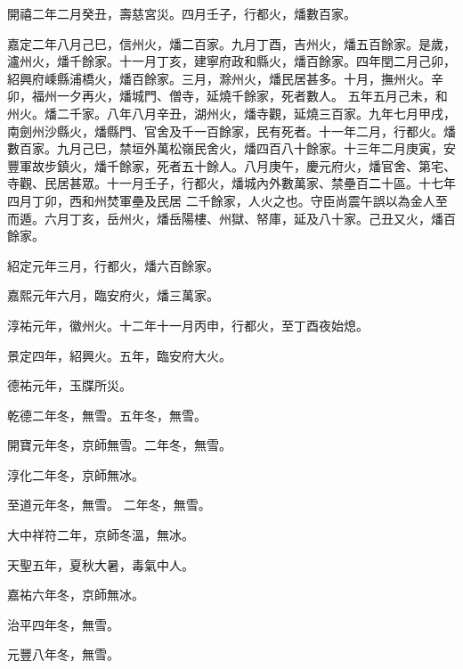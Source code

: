 \begin{pinyinscope}
 開禧二年二月癸丑，壽慈宮災。四月壬子，行都火，燔數百家。



 嘉定二年八月己巳，信州火，燔二百家。九月丁酉，吉州火，燔五百餘家。是歲，瀘州火，燔千餘家。十一月丁亥，建寧府政和縣火，燔百餘家。四年閏二月己卯，紹興府嵊縣浦橋火，燔百餘家。三月，滁州火，燔民居甚多。十月，撫州火。辛卯，福州一夕再火，燔城門、僧寺，延燒千餘家，死者數人。
 五年五月己未，和州火。燔二千家。八年八月辛丑，湖州火，燔寺觀，延燒三百家。九年七月甲戌，南劍州沙縣火，燔縣門、官舍及千一百餘家，民有死者。十一年二月，行都火。燔數百家。九月己巳，禁垣外萬松嶺民舍火，燔四百八十餘家。十三年二月庚寅，安豐軍故步鎮火，燔千餘家，死者五十餘人。八月庚午，慶元府火，燔官舍、第宅、寺觀、民居甚眾。十一月壬子，行都火，燔城內外數萬家、禁壘百二十區。十七年四月丁卯，西和州焚軍壘及民居
 二千餘家，人火之也。守臣尚震午誤以為金人至而遁。六月丁亥，岳州火，燔岳陽樓、州獄、帑庫，延及八十家。己丑又火，燔百餘家。



 紹定元年三月，行都火，燔六百餘家。



 嘉熙元年六月，臨安府火，燔三萬家。



 淳祐元年，徽州火。十二年十一月丙申，行都火，至丁酉夜始熄。



 景定四年，紹興火。五年，臨安府大火。



 德祐元年，玉牒所災。



 乾德二年冬，無雪。五年冬，無雪。



 開寶元年冬，京師無雪。二年冬，無雪。



 淳化二年冬，京師無冰。



 至道元年冬，無雪。
 二年冬，無雪。



 大中祥符二年，京師冬溫，無冰。



 天聖五年，夏秋大暑，毒氣中人。



 嘉祐六年冬，京師無冰。



 治平四年冬，無雪。



 元豐八年冬，無雪。




\end{pinyinscope}
